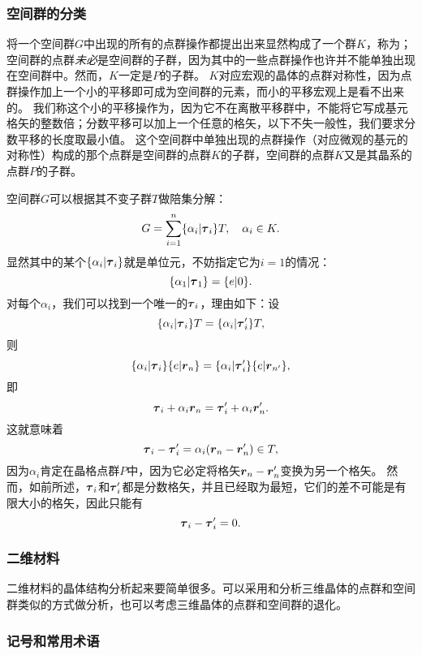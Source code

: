 \subsubsection{空间群的分类}

将一个空间群$G$中出现的所有的点群操作都提出出来显然构成了一个群$K$，称为；空间群的点群\emph{未必}是空间群的子群，因为其中的一些点群操作也许并不能单独出现在空间群中。然而，$K$一定是$P$的子群。
$K$对应宏观的晶体的点群对称性，因为点群操作加上一个小的平移即可成为空间群的元素，而小的平移宏观上是看不出来的。
我们称这个小的平移操作为，因为它不在离散平移群中，不能将它写成基元格矢的整数倍；分数平移可以加上一个任意的格矢，以下不失一般性，我们要求分数平移的长度取最小值。
这个空间群中单独出现的点群操作（对应微观的基元的对称性）构成的那个点群是空间群的点群$K$的子群，空间群的点群$K$又是其晶系的点群$P$的子群。

空间群$G$可以根据其不变子群$T$做陪集分解：
\begin{equation}
    G = \sum_{i=1}^n \{ \alpha_i | \vb*{\tau}_i \} T, \quad \alpha_i \in K.
\end{equation}
显然其中的某个$\{\alpha_i | \vb*{\tau}_i \}$就是单位元，不妨指定它为$i=1$的情况：
\begin{equation}
    \{\alpha_1 | \vb*{\tau}_1 \} = \{ e | 0 \}.
\end{equation}
对每个$\alpha_i$，我们可以找到一个唯一的$\vb*{\tau}_i$，理由如下：设
\[
    \{\alpha_i | \vb*{\tau}_i \} T = \{ \alpha_i | \vb*{\tau}'_i \} T,
\]
则
\[
    \{\alpha_i | \vb*{\tau}_i \} \{ e | \vb*{r}_n \} = \{\alpha_i | \vb*{\tau}'_i \} \{ e | \vb*{r}_{n'} \},
\]
即
\[
    \vb*{\tau}_i + \alpha_i \vb*{r}_n = \vb*{\tau}_i' + \alpha_i \vb*{r}_n'.
\]
这就意味着
\[
    \vb*{\tau}_i - \vb*{\tau}_i' = \alpha_i (\vb*{r}_n - \vb*{r}_n') \in T,
\]
因为$\alpha_i$肯定在晶格点群$P$中，因为它必定将格矢$\vb*{r}_n - \vb*{r}_n'$变换为另一个格矢。
然而，如前所述，$\vb*{\tau}_i$和$\vb*{\tau}_i'$都是分数格矢，并且已经取为最短，它们的差不可能是有限大小的格矢，因此只能有
\[
    \vb*{\tau}_i - \vb*{\tau}_i' = 0.
\]


\subsubsection{二维材料}

二维材料的晶体结构分析起来要简单很多。可以采用和分析三维晶体的点群和空间群类似的方式做分析，也可以考虑三维晶体的点群和空间群的退化。

\subsubsection{记号和常用术语}

